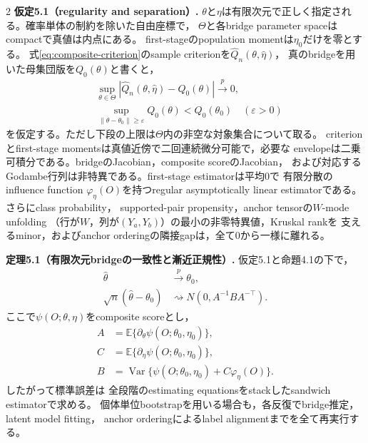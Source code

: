 \documentclass[a4paper,10pt]{article}
\newcommand{\E}{\mathbb E}
\begin{document}
\begin{multicols}{2}
\noindent\textbf{仮定5.1（regularity and separation）.}
$\theta$と$\eta$は有限次元で正しく指定される。確率単体の制約を除いた自由座標で，
$\Theta$と各bridge parameter spaceはcompactで真値は内点にある。
first-stageのpopulation momentは$\eta_0$だけを零とする。
式\eqref{eq:composite-criterion}のsample criterionを$\widehat Q_n(\theta,\widehat\eta)$，
真のbridgeを用いた母集団版を$Q_0(\theta)$と書くと，
\begin{equation}
\begin{aligned}
&\sup_{\theta\in\Theta}|\widehat Q_n(\theta,\widehat\eta)-Q_0(\theta)|
  \xrightarrow{p}0,\\
&\sup_{\|\theta-\theta_0\|\ge\varepsilon}Q_0(\theta)<Q_0(\theta_0)
  \quad(\varepsilon>0)
\end{aligned}
\label{eq:regular-uniform-separation}
\end{equation}
を仮定する。ただし下段の上限は$\Theta$内の非空な対象集合について取る。
criterionとfirst-stage momentsは真値近傍で二回連続微分可能で，必要な
envelopeは二乗可積分である。bridgeのJacobian，composite scoreのJacobian，
および対応するGodambe行列は非特異である。first-stage estimatorは平均0で
有限分散のinfluence function $\varphi_\eta(O)$を持つregular asymptotically linear
estimatorである。さらにclass probability，
supported-pair propensity，anchor tensorの$W$-mode unfolding
（行が$W$，列が$(Y_a,Y_b)$）の最小の非零特異値，Kruskal rankを
支えるminor，およびanchor orderingの隣接gapは，全て0から一様に離れる。

\noindent\textbf{定理5.1（有限次元bridgeの一致性と漸近正規性）.}
仮定5.1と命題4.1の下で，
\begin{subequations}\label{eq:estimator-asymptotics}
\begin{align}
\widehat\theta&\xrightarrow{p}\theta_0,
\label{eq:estimator-consistency}\\
\sqrt n(\widehat\theta-\theta_0)
&\rightsquigarrow N(0,A^{-1}BA^{-\top}).
\label{eq:estimator-asymptotic-normality}
\end{align}
\end{subequations}
ここで$\psi(O;\theta,\eta)$をcomposite scoreとし，
\begin{equation}
\begin{aligned}
A&=\E\{\partial_\theta\psi(O;\theta_0,\eta_0)\},\\
C&=\E\{\partial_\eta\psi(O;\theta_0,\eta_0)\},\\
B&=\operatorname{Var}\{\psi(O;\theta_0,\eta_0)
      +C\varphi_\eta(O)\}.
\end{aligned}
\label{eq:stacked-sandwich-components}
\end{equation}
したがって標準誤差は
全段階のestimating equationsをstackしたsandwich estimatorで求める。
個体単位bootstrapを用いる場合も，各反復でbridge推定，latent model fitting，
anchor orderingによるlabel alignmentまでを全て再実行する。


\end{multicols}
\end{document}
